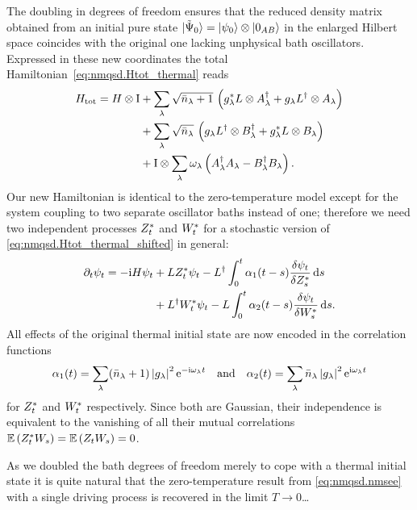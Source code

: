 The doubling in degrees of freedom ensures that the reduced density matrix obtained from an initial pure state $| \tilde\Psi_0 \rangle = | \psi_0 \rangle\otimes| 0_{AB} \rangle$ in the enlarged Hilbert space coincides with the original one lacking unphysical bath oscillators.
Expressed in these new coordinates the total Hamiltonian~\ref{eq:nmqsd.Htot_thermal} reads
\begin{align}
  H_\mathrm{tot} = H\otimes\mathrm{I} &+ \sum_\lambda \sqrt{\bar n_\lambda + 1} \, \left({g}^*_\lambda L\otimes A^\dagger_\lambda + g_\lambda L^\dagger\otimes A_\lambda \right) \nonumber \\
        \label{eq:nmqsd.Htot_thermal_shifted}
        &+ \sum_\lambda \sqrt{\bar n_\lambda} \, \left( g_\lambda L^\dagger\otimes B^\dagger_\lambda  + {g}^*_\lambda L \otimes B_\lambda \right) \\
        &+ \mathrm{I} \otimes \sum_\lambda \omega_\lambda \left( A^\dagger_\lambda A_\lambda - B^\dagger_\lambda B_\lambda \right). \nonumber
\end{align}
Our new Hamiltonian is identical to the zero-temperature model except for the system coupling to two separate oscillator baths instead of one;
therefore we need two independent processes ${Z}^*_t$ and ${W}^*_t$ for a stochastic version of \autoref{eq:nmqsd.Htot_thermal_shifted} in general:
\begin{align}
  \partial_t \psi_t = -\mathrm{i}H\psi_t &+ L{Z}^*_t\psi_t - L^\dagger\int_0^t \alpha_1(t-s) \frac{\delta \psi_t}{\delta {Z}^*_s} \, \mathrm{d} s \nonumber \\
  &+ L^\dagger {W}^*_t \psi_t - L\int_0^t \alpha_2(t-s) \frac{\delta\psi_t}{\delta {W}^*_s} \, \mathrm{d} s.
  \label{eq:nmqsd.nmsse_thermal_2processes}
\end{align}
All effects of the original thermal initial state are now encoded in the correlation functions
\begin{equation*}
  \alpha_1(t) = \sum_\lambda (\bar n_\lambda + 1) \abs{g_\lambda}^2 \exp[-\ii\omega_\lambda t] \quad \mbox{and} \quad
  \alpha_2(t) = \sum_\lambda \bar n_\lambda \abs{g_\lambda}^2 \exp[\ii\omega_\lambda t]
\end{equation*}
for ${Z}^*_t$ and ${W}^*_t$ respectively.
Since both are Gaussian, their independence is equivalent to the vanishing of all their mutual correlations $\E[\ZZ_t W_s] = \E[Z_t W_s] = 0$.

As we doubled the bath degrees of freedom merely to cope with a thermal initial state it is quite natural that the zero-temperature result from \autoref{eq:nmqsd.nmsee} with a single driving process is recovered in the limit $T \to 0$\dots

